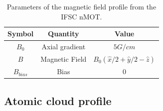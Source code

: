 \begin{table}[ht!]
    \centering
    \caption{Parameters of the magnetic field profile from the IFSC nMOT.}
    \begin{tabular}{|c|c|c|}
        \hline
        \textbf{Symbol} & \textbf{Quantity} & \textbf{Value} \\ \hline
        $ B_0 $ & Axial gradient & $ 5 G / cm $ \\
        $ B $ & Magnetic Field & $ B_0(\hat{x}/2 + \hat{y}/2 - \hat{z}) $ \\
        $ B_{bias} $ & Bias & $ 0 $ \\
        \hline
    \end{tabular}
    \vspace{10px}
    \label{tab:IFSC-magnetic-field}
\end{table}

\subsection{Atomic cloud profile}
\label{sec:cloud-profile-dysprosium}

